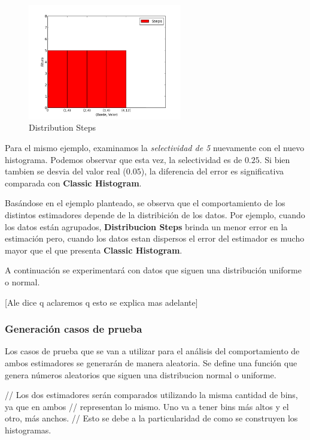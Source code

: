 \documentclass[10pt, a4paper,english,spanish,hidelinks]{article}
\begin{document}
\begin{figure}[h!]
  \centering
  \includegraphics[width=0.6\textwidth]{./imagenes/ejb1_ejemplo_steps.png}
  \caption{Distribution Steps}
\end{figure}


Para el mismo ejemplo, examinamos la \textit{selectividad de 5} nuevamente con el nuevo histograma.
Podemos observar que esta vez, la selectividad es de $0.25$. Si bien tambien se desvia del
valor real ($0.05$), la diferencia del error es significativa comparada con \textbf{Classic Histogram}.


Basándose en el ejemplo planteado, se observa que el comportamiento de los distintos estimadores
depende de la distribición de los datos.
Por ejemplo, cuando los datos están agrupados, \textbf{Distribucion Steps} brinda un menor
error en la estimación pero, cuando los datos estan dispersos el error del estimador es
mucho mayor que el que presenta \textbf{Classic Histogram}.

A continuación se experimentará con datos que siguen una distribución uniforme o normal.


[Ale dice q aclaremos q esto se explica mas adelante]


\subsubsection{Generación casos de prueba}
Los casos de prueba que se van a utilizar para el análisis del comportamiento de ambos
estimadores se generarán de manera aleatoria. Se define una función que genera números
aleatorios que siguen una distribucion normal o uniforme.


// Los dos estimadores serán comparados utilizando la misma cantidad de bins, ya que en ambos
// representan lo mismo. Uno va a tener bins más altos y el otro, más anchos.
// Esto se debe a la particularidad de como se construyen los histogramas.
\end{document}
